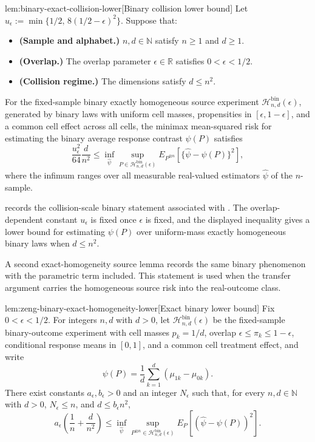 \begin{lemmav}{lem:binary-exact-collision-lower}[Binary collision lower bound]
Let \(u_{\epsilon}:=\min\{1/2,\,8(1/2-\epsilon)^2\}\).  Suppose that:
\begin{itemize}
\item \textbf{(Sample and alphabet.)} \(n,d\in\mathbb N\) satisfy \(n\ge 1\) and \(d\ge 1\).
\item \textbf{(Overlap.)} The overlap parameter \(\epsilon\in\mathbb R\) satisfies \(0<\epsilon<1/2\).
\item \textbf{(Collision regime.)} The dimensions satisfy \(d\le n^2\).
\end{itemize}
For the fixed-sample binary exactly homogeneous source experiment \(\mathcal H_{n,d}^{\mathrm{bin}}(\epsilon)\), generated by binary laws with uniform cell masses, propensities in \([\epsilon,1-\epsilon]\), and a common cell effect across all cells, the minimax mean-squared risk for estimating the binary average response contrast \(\psi(P)\) satisfies
\[
\frac{u_{\epsilon}^2}{64}\frac{d}{n^2}
\le
\inf_{\widehat\psi}
\sup_{P\in\mathcal H_{n,d}^{\mathrm{bin}}(\epsilon)}
E_{P^{\otimes n}}\!\left[\{\widehat\psi-\psi(P)\}^2\right],
\]
where the infimum ranges over all measurable real-valued estimators \(\widehat\psi\) of the \(n\)-sample.
\end{lemmav}

 records the collision-scale binary statement associated with \citet{ZengBalakrishnanHanKennedy2024}. The overlap-dependent constant \(u_{\epsilon}\) is fixed once \(\epsilon\) is fixed, and the displayed inequality gives a lower bound for estimating \(\psi(P)\) over uniform-mass exactly homogeneous binary laws when \(d\le n^2\).

A second exact-homogeneity source lemma records the same binary phenomenon with the parametric term included. This statement is used when the transfer argument carries the homogeneous source risk into the real-outcome class.

\begin{lemmav}{lem:zeng-binary-exact-homogeneity-lower}[Exact binary lower bound]
Fix \(0<\epsilon<1/2\).  For integers \(n,d\) with \(d>0\), let \(\mathcal H_{n,d}^{\mathrm{bin}}(\epsilon)\) be the fixed-sample binary-outcome experiment with cell masses \(p_k=1/d\), overlap \(\epsilon\le \pi_k\le 1-\epsilon\), conditional response means in \([0,1]\), and a common cell treatment effect, and write
\[
\psi(P)=\frac{1}{d}\sum_{k=1}^d(\mu_{1k}-\mu_{0k}).
\]
There exist constants \(a_\epsilon,b_\epsilon>0\) and an integer \(N_\epsilon\) such that, for every \(n,d\in\mathbb N\) with \(d>0\), \(N_\epsilon\le n\), and \(d\le b_\epsilon n^2\),
\[
a_\epsilon\left(\frac{1}{n}+\frac{d}{n^2}\right)
\le
\inf_{\widehat\psi}\sup_{P^{\otimes n}\in\mathcal H_{n,d}^{\mathrm{bin}}(\epsilon)}
E_P\!\left[(\widehat\psi-\psi(P))^2\right].
\]
\end{lemmav}


